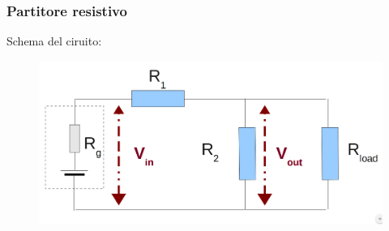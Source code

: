 
\subsubsection{Partitore resistivo}
%
    Schema del ciruito:
    \begin{figure}[H]
    \centering
    \includegraphics[scale=.25]{Grafici/C1_P2.png}
    \end{figure} 

